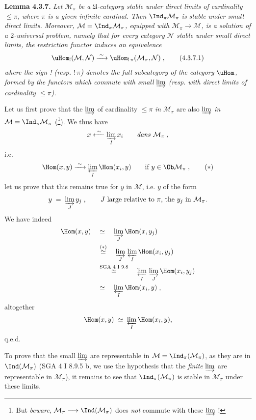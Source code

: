 \textbf{Lemma 4.3.7.} \textit{Let $\mathcal{M}_\pi$ be a $\mathfrak{U}$-category stable under direct limits of cardinality $\leqslant \pi$, where $\pi$ is a given infinite cardinal. Then} $\Ind_\pi\mathcal{M}_\pi$ \textit{is stable under small direct limits. Moreover, $\mathcal{M} = \Ind_\pi\mathcal{M}_\pi$, equipped with $\mathcal{M}_\pi \longrightarrow \mathcal{M}$, is a solution of a $2$-universal problem, namely
that for every category $\mathcal{N}$ stable under small direct limits, the restriction functor induces an equivalence}
\[
\uHom_{!}(\mathcal{M},\mathcal{N}) \xrightarrow{\;\sim\;} \uHom_{!\,\pi}(\mathcal{M}_\pi,\mathcal{N}) \;, \tag*{(4.3.7.1)}
\]
\textit{where the sign ! (resp. $!\,\pi$) denotes the full subcategory of the category} $\uHom$\textit{, formed by the functors which commute with small} $\varinjlim$ \textit{(resp. with direct limits of cardinality $\leqslant \pi$).}

Let us first prove that the $\varinjlim$ of cardinality $\leqslant \pi$ \textit{in} $\mathcal{M}_\pi$ are also $\varinjlim$ \textit{in} $\mathcal{M} = \Ind_\pi\mathcal{M}_\pi$ (\footnote{But \textit{beware}, $\mathcal{M}_\pi \longrightarrow \Ind(\mathcal{M}_\pi)$ does \textit{not} commute with these $\varinjlim$ !}). We thus have
\[
x \xleftarrow{\;\sim\;} \varinjlim_{I} x_i \qquad \textit{dans } \mathcal{M}_\pi \;,
\]
i.e.
\[
\Hom(x,y) \xrightarrow{\;\sim\;} \varprojlim_{I} \Hom(x_i,y) \qquad \text{if } y \in \Ob\mathcal{M}_\pi \;, \tag*{$(*)$}
\]
let us prove that this remains true for $y$ in $\mathcal{M}$, i.e. $y$ of the form
\[
y \;=\; \varinjlim_{J} y_j \;, \qquad J \text{ large relative to } \pi\text{, the } y_j \text{ in } \mathcal{M}_\pi.
\]
We have indeed
\[
\begin{aligned}
\Hom(x,y) \quad &\simeq \quad \varinjlim_{J} \Hom(x,y_j)\\
&\overset{(*)}{\simeq} \quad \varinjlim_{J}\, \varprojlim_{I} \Hom(x_i,y_j)\\
&\overset{\text{SGA 4 I 9.8}}{\simeq} \quad \varprojlim_{I}\, \varinjlim_{J} \Hom(x_i,y_j)\\
&\simeq \quad \varprojlim_{I} \Hom(x_i,y) \;,
\end{aligned}
\]
altogether
\[
\Hom(x,y) \;\simeq\; \varprojlim_{I} \Hom(x_i,y),
\]
q.e.d.

To prove that the small $\varinjlim$ are representable in $\mathcal{M} = \Ind_\pi(\mathcal{M}_\pi)$, as they are in $\Ind(\mathcal{M}_\pi)$ (SGA 4 I 8.9.5 b, we use the hypothesis that the \textit{finite} $\varinjlim$ are representable in $\mathcal{M}_\pi$), it remains to see that $\Ind_\pi(\mathcal{M}_\pi)$ is stable in $\mathcal{M}_\pi$ under these limits.

